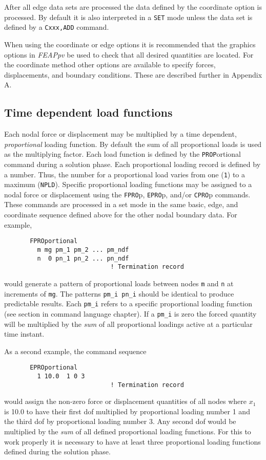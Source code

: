 After all edge data sets are processed the data defined by the coordinate
option is processed.  By default it is also interpreted in a {\tt SET}
mode unless the data set is defined by a {\tt Cxxx,ADD} command.

When using the coordinate or edge options it is recommended that the graphics
options in {\sl FEAPpv} be used to check that all desired quantities are located.
For the coordinate method other options are available to specify
forces, displacements, and boundary conditions.  These are described further
in Appendix A.

\subsection{Time dependent load functions}

Each nodal force or displacement may be multiplied by a time dependent,
{\it proportional} loading function.  By default the sum of all proportional
loads is used as the multiplying factor.  Each load function is defined
by the {\tt PROP}ortional command during a solution phase.  Each proportional
loading record is defined by a number.  Thus, the number for a proportional
load varies from one ({\tt 1}) to a maximum ({\tt NPLD}). Specific
proportional loading functions may be assigned to a nodal force or
displacement using the {\tt FPRO}p, {\tt EPRO}p, and/or {\tt CPRO}p commands. 
These commands are processed in a set mode in the same basic, edge, and
coordinate sequence defined above for the other nodal boundary data.
For example,
\begin{verbatim}
       FPROportional
         m mg pm_1 pm_2 ... pm_ndf
         n  0 pn_1 pn_2 ... pn_ndf
                             ! Termination record
\end{verbatim}
would generate a pattern of proportional loads between nodes {\tt m} and {\tt n}
at increments of {\tt mg}.  The patterns {\tt pm\_i pn\_i} should be identical
to produce predictable results. 
Each {\tt pm\_i} refers to a specific proportional loading function (see
section in command language chapter).  If a {\tt pm\_i} is zero the forced
quantity will be multiplied by the {\it sum} of all proportional loadings
active at a particular time instant.


As a second example, the command sequence
\begin{verbatim}
       EPROportional
         1 10.0  1 0 3
                             ! Termination record
\end{verbatim}
would assign the non-zero force or displacement quantities of
all nodes where $x_1$ is 10.0 to have their first dof
multiplied by proportional loading number 1 and the third dof by proportional
loading number 3.  Any second dof would be multiplied by the {\it sum}
of all defined proportional loading functions.  For this to work properly
it is necessary to have at least three proportional loading functions
defined during the solution phase.


